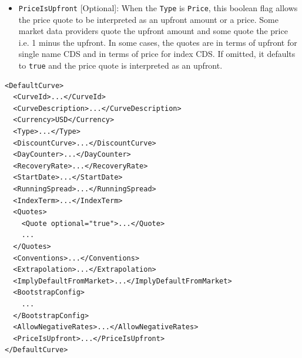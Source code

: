 \begin{itemize}
\item \lstinline!PriceIsUpfront! [Optional]:
When the \lstinline!Type! is \lstinline!Price!, this boolean flag allows the price quote to be interpreted as an 
upfront amount or a price. Some market data providers quote the upfront amount and some quote the price i.e. 1 minus 
the upfront. In some cases, the quotes are in terms of upfront for single name CDS and in terms of price for index 
CDS. If omitted, it defaults to \lstinline!true! and the price quote is interpreted as an upfront.

\end{itemize}

\begin{longlisting}
\begin{verbatim}
<DefaultCurve>
  <CurveId>...</CurveId>
  <CurveDescription>...</CurveDescription>
  <Currency>USD</Currency>
  <Type>...</Type>
  <DiscountCurve>...</DiscountCurve>
  <DayCounter>...</DayCounter>
  <RecoveryRate>...</RecoveryRate>
  <StartDate>...</StartDate>
  <RunningSpread>...</RunningSpread>
  <IndexTerm>...</IndexTerm>
  <Quotes>
    <Quote optional="true">...</Quote>
    ...
  </Quotes>
  <Conventions>...</Conventions>
  <Extrapolation>...</Extrapolation>
  <ImplyDefaultFromMarket>...</ImplyDefaultFromMarket>
  <BootstrapConfig>
    ...
  </BootstrapConfig>
  <AllowNegativeRates>...</AllowNegativeRates>
  <PriceIsUpfront>...</PriceIsUpfront>
</DefaultCurve>
\end{verbatim}
\caption{Default curve configuration based on CDS quotes}
\label{lst:defaultcurve_cds_configuration}
\end{longlisting}
